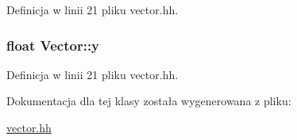 Definicja w linii 21 pliku vector.\-hh.

\hypertarget{class_vector_a81be9102fca6d9beea3efef522c4c09d}{
\subsubsection[{y}]{\setlength{\rightskip}{0pt plus 5cm}float Vector\-::y\hspace{0.3cm}{\ttfamily [private]}}}\label{class_vector_a81be9102fca6d9beea3efef522c4c09d}


Definicja w linii 21 pliku vector.\-hh.



Dokumentacja dla tej klasy została wygenerowana z pliku\-:\begin{DoxyCompactItemize}
\item 
\hyperlink{vector_8hh}{vector.\-hh}\end{DoxyCompactItemize}
